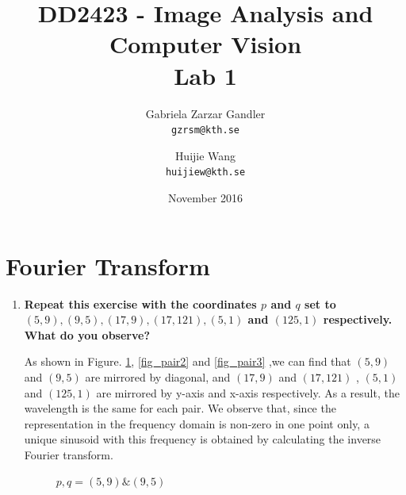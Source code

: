 \documentclass{article}
\title{DD2423 - Image Analysis and Computer Vision\\
  \large Lab 1}
\author{
  Gabriela Zarzar Gandler\\
  \texttt{gzrsm@kth.se}
  \and
 Huijie Wang\\
  \texttt{huijiew@kth.se}
}
\date{November 2016}
\begin{document}
\maketitle

\section{Fourier Transform}
\begin{enumerate}

\item \textbf{Repeat this exercise with the coordinates $p$ and $q$ set to $(5, 9), (9, 5), (17, 9), (17, 121), (5, 1)$ and $(125, 1)$ respectively. What do you observe?}

As shown in Figure. \ref{fig_pair1}, \ref{fig_pair2} and \ref{fig_pair3} ,we can find that  $(5, 9)$ and $(9, 5)$ are mirrored by diagonal, and $(17, 9)$ and $(17, 121)$ , $(5, 1)$ and $(125, 1)$ are mirrored by y-axis and x-axis respectively. 
As a result, the wavelength is the same for each pair. We observe that, since the representation in the frequency domain is non-zero in one point only, a unique sinusoid with this frequency is obtained by calculating the inverse Fourier transform.

\begin{figure}[H]
    \centering
    \caption{$p,q = (5, 9) \& (9,5)$}
    \label{fig_pair1}
\end{figure}


\end{enumerate}
\end{document}
